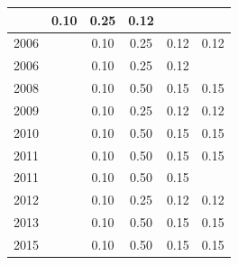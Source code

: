\begin{table}[H]
\begin{tabular}{| l | c | c | c | c | c |}
          &
          0.10
          &
          0.25
          &
          0.12
          &
          \\
\hline
            2006
          &
          
          &
          0.10
          &
          0.25
          &
          0.12
          &
            {\color{red} 0.12}
          \\
            2006
          &
          
          &
          0.10
          &
          0.25
          &
          0.12
          &
          \\
\hline
            2008
          &
          
          &
          0.10
          &
          0.50
          &
          0.15
          &
            {\color{red} 0.15}
          \\
\hline
            2009
          &
          
          &
          0.10
          &
          0.25
          &
          0.12
          &
            {\color{red} 0.12}
          \\
\hline
            2010
          &
          
          &
          0.10
          &
          0.50
          &
          0.15
          &
            {\color{red} 0.15}
          \\
\hline
            2011
          &
          
          &
          0.10
          &
          0.50
          &
          0.15
          &
            {\color{red} 0.15}
          \\
            2011
          &
          
          &
          0.10
          &
          0.50
          &
          0.15
          &
          \\
\hline
            2012
          &
          
          &
          0.10
          &
          0.25
          &
          0.12
          &
            {\color{red} 0.12}
          \\
\hline
            2013
          &
          
          &
          0.10
          &
          0.50
          &
          0.15
          &
            {\color{red} 0.15}
          \\
\hline
            2015
          &
          
          &
          0.10
          &
          0.50
          &
          0.15
          &
            {\color{red} 0.15}
          \\
\hline
\end{tabular}
\end{table}

